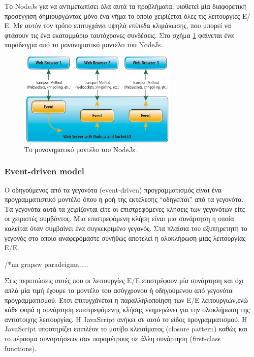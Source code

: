 		 
		 Το NodeJs για να αντιμετωπίσει όλα αυτά τα προβλήματα, υιοθετεί μία διαφορετική προσέγγιση δημιουργώντας μόνο ένα νήμα το οποίο χειρίζεται όλες τις λειτουργίες Ε/Ε. Με αυτόν τον τρόπο επιτυγχάνει υψηλά επίπεδα κλιμάκωσης, που μπορεί να φτάσουν τις ένα εκατομμύριο ταυτόχρονες συνδέσεις. Στο σχήμα \ref{fig:single} φαίνεται ένα παράδειγμα από το μονονηματικό μοντέλο του NodeJs.
		 
			 \begin{figure}[h]
	    \centering
	    \includegraphics[width=0.7\textwidth]{single.png}
	    \caption{ Το μονονηματικό μοντέλο του NodeJs.}
	    \label{fig:single}
	\end{figure} 

\subsubsection{Event-driven model}		 

		O οδηγούμενος από τα γεγονότα (event-driven) προγραμματισμός είναι ένα προγραμματιστικό μοντέλο όπου η ροή της εκτέλεσης “οδηγείται” από τα γεγονότα. Τα γεγονότα αυτά τα χειρίζονται είτε οι επιστρεφόμενες κλήσεις των γεγονότων είτε οι χειριστές συμβάντος. Μια επιστρεφόμενη κλήση είναι μια συνάρτηση η οποία καλείται όταν συμβαίνει ένα συγκεκριμένο γεγονός. Στα πλαίσια του εξυπηρετητή το γεγονός στο οποίο αναφερόμαστε συνήθως αποτελεί η ολοκλήρωση μιας λειτουργίας Ε/Ε. 
		

		/*na grapsw paradeigma.....
		
		Στις περιπτώσεις αυτές που οι λειτουργίες Ε/Ε επιστρέφουν μία συνάρτηση και όχι απλά μία τιμή έχουμε το μοντέλο του ασύγχρονου ή οδηγούμενου από γεγονότα προγραμματισμού. Έτσι επιτυγχάνεται η παραλληλοποίηση των Ε/Ε λειτουργιών,ενώ κάθε φορά η συνάρτηση επιστρεφόμενης κλήσης ενημερώνει για την ολοκλήρωση της αντίστοιχης λειτουργίας. Η JavaScript ανήκει σε αυτό το είδος προγραμματισμού. Η JavaScript υποστηρίζει επιπλέον το μοτίβο κλεισίματος (closure pattern) καθώς και το πέρασμα συναρτήσεων σαν παραμέτρους σε άλλη συνάρτηση (first-class functions).
		

